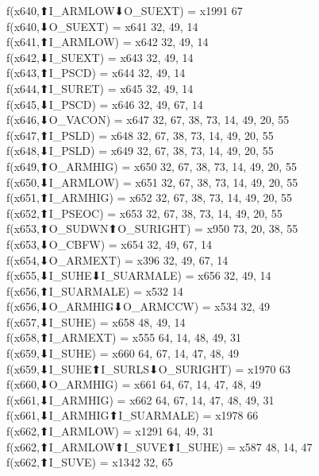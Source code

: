 f(x640,⬆I_ARMLOW⬇O_SUEXT) = x1991 {67} \\
f(x640,⬇O_SUEXT) = x641 {32, 49, 14} \\
f(x641,⬆I_ARMLOW) = x642 {32, 49, 14} \\
f(x642,⬇I_SUEXT) = x643 {32, 49, 14} \\
f(x643,⬆I_PSCD) = x644 {32, 49, 14} \\
f(x644,⬆I_SURET) = x645 {32, 49, 14} \\
f(x645,⬇I_PSCD) = x646 {32, 49, 67, 14} \\
f(x646,⬇O_VACON) = x647 {32, 67, 38, 73, 14, 49, 20, 55} \\
f(x647,⬆I_PSLD) = x648 {32, 67, 38, 73, 14, 49, 20, 55} \\
f(x648,⬇I_PSLD) = x649 {32, 67, 38, 73, 14, 49, 20, 55} \\
f(x649,⬆O_ARMHIG) = x650 {32, 67, 38, 73, 14, 49, 20, 55} \\
f(x650,⬇I_ARMLOW) = x651 {32, 67, 38, 73, 14, 49, 20, 55} \\
f(x651,⬆I_ARMHIG) = x652 {32, 67, 38, 73, 14, 49, 20, 55} \\
f(x652,⬆I_PSEOC) = x653 {32, 67, 38, 73, 14, 49, 20, 55} \\
f(x653,⬆O_SUDWN⬆O_SURIGHT) = x950 {73, 20, 38, 55} \\
f(x653,⬇O_CBFW) = x654 {32, 49, 67, 14} \\
f(x654,⬇O_ARMEXT) = x396 {32, 49, 67, 14} \\
f(x655,⬇I_SUHE⬇I_SUARMALE) = x656 {32, 49, 14} \\
f(x656,⬆I_SUARMALE) = x532 {14} \\
f(x656,⬇O_ARMHIG⬇O_ARMCCW) = x534 {32, 49} \\
f(x657,⬇I_SUHE) = x658 {48, 49, 14} \\
f(x658,⬆I_ARMEXT) = x555 {64, 14, 48, 49, 31} \\
f(x659,⬇I_SUHE) = x660 {64, 67, 14, 47, 48, 49} \\
f(x659,⬇I_SUHE⬆I_SURLS⬇O_SURIGHT) = x1970 {63} \\
f(x660,⬇O_ARMHIG) = x661 {64, 67, 14, 47, 48, 49} \\
f(x661,⬇I_ARMHIG) = x662 {64, 67, 14, 47, 48, 49, 31} \\
f(x661,⬇I_ARMHIG⬆I_SUARMALE) = x1978 {66} \\
f(x662,⬆I_ARMLOW) = x1291 {64, 49, 31} \\
f(x662,⬆I_ARMLOW⬆I_SUVE⬆I_SUHE) = x587 {48, 14, 47} \\
f(x662,⬆I_SUVE) = x1342 {32, 65} \\
